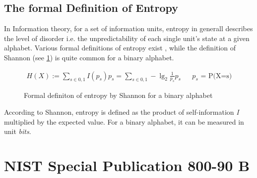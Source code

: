 \subsection{The formal Definition of Entropy}
In Information theory, for a set of information units, entropy in generall describes the level of disorder i.e. the unpredictability of each single unit's state at a given alphabet. Various formal definitions of entropy exist \cite{hagerty2012entropy}, while the definition of Shannon (see \ref{fig:form-entropy-shan}) is quite common for a binary alphabet. 

\begin{figure}[H]
	\begin{align*}
	\displaystyle H(X) := \sum_{s \in {0,1}} I(p_s) p_s = \sum_{s \in {0,1}} -\lg_2 \frac{1}{p_s} p_s && \text{$p_s$ = P(X=s)}
	\end{align*}
	\caption{Formal definiton of entropy by Shannon for a binary alphabet}
	\label{fig:form-entropy-shan}
\end{figure}
According to Shannon, entropy is defined as the product of self-information \textit{I} multiplied by the expected value. For a binary alphabet, it can be measured in unit \textit{bits}. 



\section{NIST Special Publication 800-90 B}


